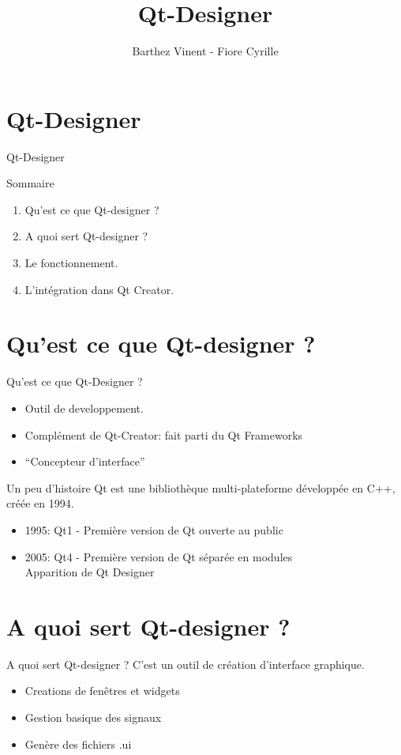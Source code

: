 \documentclass{beamer}
\title{Qt-Designer}
\author{Barthez Vinent - Fiore Cyrille}
\begin{document}
\section{Qt-Designer}
\begin {frame}{Qt-Designer}
\maketitle
\end{frame}

\begin {frame}[fragile]{Sommaire}
 \begin{enumerate}
  \item Qu'est ce que Qt-designer ?
  \item A quoi sert Qt-designer ?
  \item Le fonctionnement.
  \item L'intégration dans Qt Creator.
 \end{enumerate}
\end{frame}

\section{Qu'est ce que Qt-designer ?}
\begin{frame}[fragile]{Qu'est ce que Qt-Designer ?}
 \begin{itemize} [<+-|alert@+>]
  \item Outil de developpement.
  \item Complément de Qt-Creator: fait parti du Qt Frameworks
  \item ``Concepteur d'interface''
 \end{itemize}
\end{frame}

\begin{frame}[fragile]{Un peu d'histoire}
Qt est une bibliothèque multi-plateforme développée en C++, créée en 1994.
\pause
 \begin{itemize} [<+-|alert@+>]
  \item 1995: Qt1 - Première version de Qt ouverte au public
  \item 2005: Qt4 - Première version de Qt séparée en modules \\
  Apparition de Qt Designer
 \end{itemize}
\end{frame}

\section{A quoi sert Qt-designer ?}
\begin{frame}[fragile]{A quoi sert Qt-designer ?}
C'est un outil de création d'interface graphique.
\pause
 \begin{itemize} [<+-|alert@+>]
  \item Creations de fenêtres et widgets
  \item Gestion basique des signaux
  \item Genère des fichiers .ui
 \end{itemize}
\end{frame}
\end{document}
